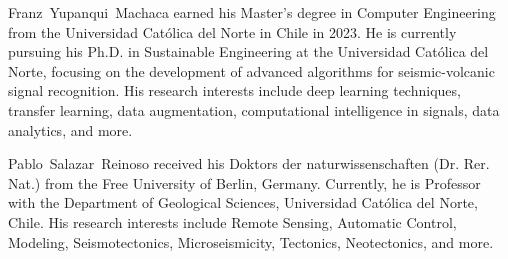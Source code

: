 \documentclass[journal]{IEEEtran}
\begin{document}
%
\begin{IEEEbiography}{Franz~Yupanqui~Machaca}
earned his Master's degree in Computer Engineering from the Universidad Católica del Norte in Chile in 2023. He is currently pursuing his Ph.D. in Sustainable Engineering at the Universidad Católica del Norte, focusing on the development of advanced algorithms for seismic-volcanic signal recognition. His research interests include deep learning techniques, transfer learning, data augmentation, computational intelligence in signals, data analytics, and more.
\end{IEEEbiography}

\begin{IEEEbiography}{Pablo~Salazar~Reinoso}
received his Doktors der naturwissenschaften (Dr. Rer. Nat.) from the Free University of Berlin, Germany. Currently, he is Professor with the Department of Geological Sciences, Universidad Católica del Norte, Chile. His research interests include Remote Sensing, Automatic Control, Modeling, Seismotectonics, Microseismicity, Tectonics, Neotectonics, and more.
\end{IEEEbiography}
\end{document}
